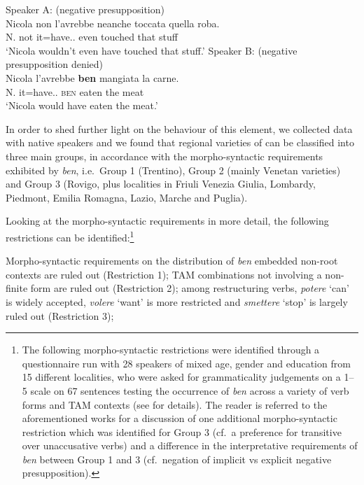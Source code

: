 \documentclass[output=paper]{langsci/langscibook}
\begin{document}
\ea {}
	\ea Speaker A: (negative presupposition)\\
		\gll    Nicola non l’avrebbe neanche toccata quella roba.\\
			    N. not it=have.\Cond{}.\Tsg{} even touched that stuff\\
        \glt    \enquote*{Nicola wouldn’t even have touched that stuff.}
	\ex Speaker B: (negative presupposition denied)\\
		\gll    Nicola l’avrebbe \textbf{ben} mangiata la carne.\\
			    N. it=have.\Cond{}.\Tsg{} \textsc{ben} eaten the meat\\
        \glt    \enquote*{Nicola would have eaten the meat.}
	\z
\z

In order to shed further light on the behaviour of this element, we collected
data with native speakers and we found that regional varieties of  can
be classified into three main groups, in accordance with the morpho-syntactic
requirements exhibited by \emph{ben}, i.e.\ Group 1 (Trentino), Group 2 (mainly
Venetan varieties) and Group 3 (Rovigo, plus localities in Friuli Venezia
Giulia, Lombardy, Piedmont, Emilia Romagna, Lazio, Marche and Puglia).

Looking at the morpho-syntactic requirements in more detail, the following
restrictions can be identified:\footnote{The following morpho-syntactic
    restrictions were identified through a questionnaire run with 28 speakers
    of mixed age, gender and education from 15 different localities, who were
    asked for grammaticality judgements on a 1--5 scale on 67 sentences
    testing the occurrence of \emph{ben} across a variety of verb forms and
    \gls{TAM} contexts (see \citealt{CognSchi2018b,CognSchi2018} for details).
    The reader is referred to the aforementioned works for a discussion of one
    additional morpho-syntactic restriction which was identified for Group 3
    (cf.\ a preference for transitive over unaccusative verbs) and a difference
    in the interpretative requirements of \emph{ben} between Group 1 and 3
    (cf.\ negation of implicit vs explicit negative presupposition).}

\newpage

\ea\label{ex:schifano:12.3} Morpho-syntactic requirements on the distribution of
        \emph{ben}
	\ea embedded non-root contexts are ruled out (Restriction 1);
    \ex \gls{TAM} combinations not involving a non-finite form are ruled out
        (Restriction 2);
    \ex among restructuring verbs, \emph{potere} ‘can’ is widely accepted,
        \emph{volere} ‘want’ is more restricted and
        \emph{smettere} ‘stop’ is largely ruled out (Restriction 3);
	\z
\z
\end{document}
